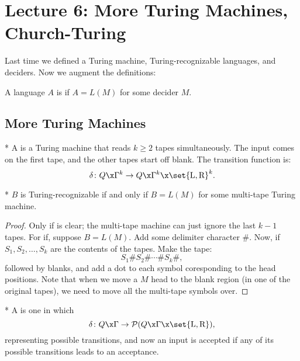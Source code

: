 \section*{Lecture 6: More Turing Machines, Church-Turing}
\setcounter{section}{6}
\setcounter{subsection}{0}
\setcounter{defn}{0}
\setcounter{defncontainer}{0}

Last time we defined a Turing machine, Turing-recognizable languages, and deciders. 
Now we augment the definitions:

\begin{defn}
	A language $A$ is  if $A = L(M)$ for some decider $M$.
\end{defn}

\subsection{More Turing Machines}

\begin{defn}*
	A  is a Turing machine that reads $k \geq 2$ tapes simultaneously. The input comes on the first tape, and the other tapes start off blank. The transition function is: \[
		\delta \colon Q\x \Gamma^k \to Q\x \Gamma^k \x \set{\textnormal{L}, \textnormal{R}}^k.
	\]
\end{defn}

\begin{thm}*
	$B$ is Turing-recognizable if and only if $B = L(M)$ for some multi-tape Turing machine.
\end{thm}

\begin{proof}
	Only if is clear; the multi-tape machine can just ignore the last $k-1$ tapes. For if, suppose $B = L(M)$.
	Add some delimiter character $\#$. 
	Now, if $S_1, S_2, \ldots, S_k$ are the contents of the tapes. Make the tape: \[
		S_1\# S_2\# \cdots \# S_k \#,
	\]followed by blanks, and add a dot to each symbol coresponding to the head positions.
	Note that when we move a $M$ head to the blank region (in one of the original tapes), we need to move all the multi-tape symbols over.
\end{proof}

\begin{defn}*
	A  is one in which \[
		\delta \colon Q\x \Gamma \to \mathcal P(Q\x \Gamma \x \set{\textnormal L, \textnormal R}),
	\]
	representing possible transitions,
	and now an input is accepted if any of its possible transitions leads to an acceptance.
\end{defn}

